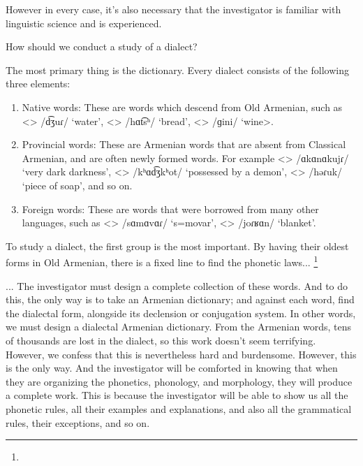 However in every case, it's also necessary that the investigator is familiar with linguistic science and is experienced. 

How should we conduct a study of a dialect?

The most primary thing is the dictionary. Every dialect consists of the following three elements:
\begin{enumerate}
	\item Native words: These are words which descend from Old Armenian, such as <> /d͡ʒuɾ/ `water', <> /hɑt͡sʰ/ `bread', <> /ɡini/ `wine>.
	\item Provincial words: These are Armenian words that are absent from Classical Armenian, and are often newly formed words. For example <> /ɑkɑnɑkujɾ/ `very dark darkness', <> /kʰɑd͡ʒkʰot/ `possessed by a demon', <> /həɾuk/ `piece of soap', and so on. 
	\item Foreign words: These are words that were borrowed from many other languages, such as <> /sɑmɑvɑɾ/ `s=movar', <> /joɾʁɑn/ `blanket'.
\end{enumerate}

To study a dialect, the first group is the most important. By having their oldest forms in Old Armenian, there is a fixed line to find the phonetic laws... \footnote{} 



\begin{adjarianpage}\label{page:12}\end{adjarianpage}%

... The investigator must design a complete collection of these words. And to do this, the only way is to take an Armenian dictionary; and against each word, find the dialectal form, alongside its declension or conjugation system. In other words, we must design a dialectal Armenian dictionary. From the Armenian words, tens of thousands are lost in the dialect, so this work doesn't seem terrifying. However, we confess that this is nevertheless hard and burdensome. However, this is the only way. And the investigator will be comforted in knowing that when they are organizing the phonetics, phonology, and morphology, they will produce a complete work. This is because the investigator will be able to show us all the phonetic rules, all their examples and explanations, and also all the grammatical rules, their exceptions, and so on. 

